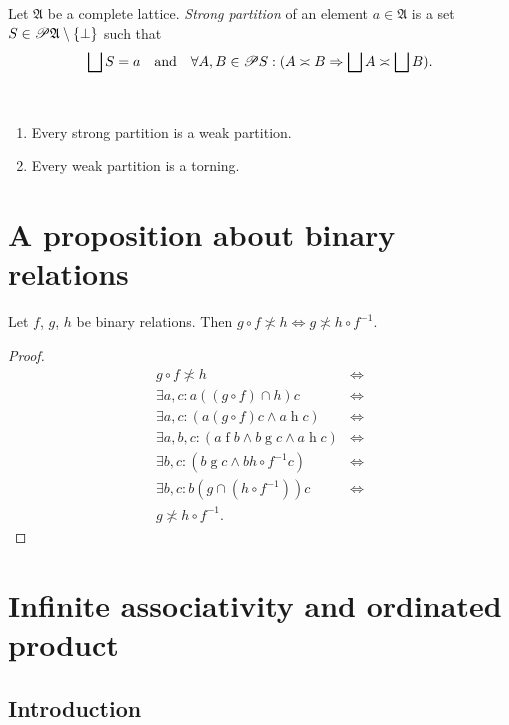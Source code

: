 \begin{defn}
Let $\mathfrak{A}$ be a complete lattice.
\emph{Strong partition} of an element $a\in\mathfrak{A}$ is a set
$S\in\mathscr{P}\mathfrak{A}\setminus\{\bot\}$ such that
\[
\bigsqcup S=a\quad\text{and}\quad\forall A,B\in\mathscr{P} S:(A\asymp B\Rightarrow\bigsqcup A\asymp\bigsqcup B).
\]
\end{defn}
\begin{obvious}
~
\begin{enumerate}
\item Every strong partition is a weak partition.
\item Every weak partition is a torning.
\end{enumerate}
\end{obvious}

\section{A proposition about binary relations}
\begin{prop}
\label{rel-cross}Let $f$, $g$, $h$ be binary relations. Then $g\circ f\nasymp h\Leftrightarrow g\nasymp h\circ f^{-1}$.\end{prop}
\begin{proof}
~
\begin{align*}
g\circ f\nasymp h & \Leftrightarrow\\
\exists a,c:a\mathrel{((g\circ f)\cap h)}c & \Leftrightarrow\\
\exists a,c:(a\mathrel{(g\circ f)}c\land a\mathrel{h}c) & \Leftrightarrow\\
\exists a,b,c:(a\mathrel{f}b\land b\mathrel{g}c\land a\mathrel{h}c) & \Leftrightarrow\\
\exists b,c:(b\mathrel{g}c\land b\mathrel{h\circ f^{-1}}c) & \Leftrightarrow\\
\exists b,c:b\mathrel{(g\cap(h\circ f^{-1}))}c & \Leftrightarrow\\
g\nasymp h\circ f^{-1}.
\end{align*}

\end{proof}

\section{Infinite associativity and ordinated product}


\subsection{Introduction}

